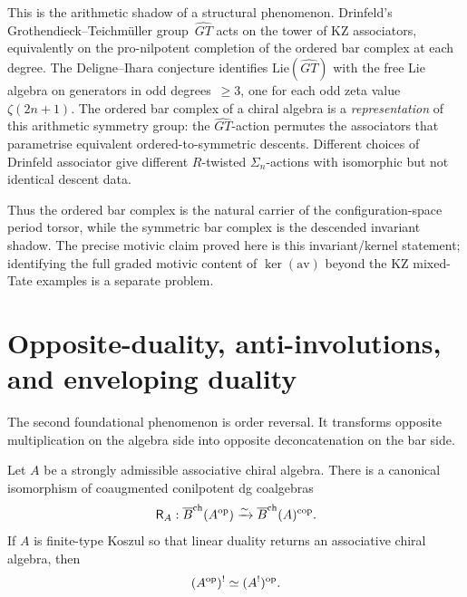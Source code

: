 \begin{remark}
This is the arithmetic shadow of a structural phenomenon.
Drinfeld's Grothendieck--Teichm\"uller group~$\widehat{GT}$
acts on the tower of KZ associators, equivalently on the
pro-nilpotent completion of the ordered bar complex at each
degree. The Deligne--Ihara conjecture identifies
$\mathrm{Lie}(\widehat{GT})$ with the free Lie algebra on
generators in odd degrees~$\geq 3$, one for each odd
zeta value~$\zeta(2n+1)$. The ordered bar complex of a
chiral algebra is a \emph{representation} of this arithmetic
symmetry group: the $\widehat{GT}$-action permutes the
associators that parametrise equivalent ordered-to-symmetric
descents. Different choices of Drinfeld associator give
different $R$-twisted $\Sigma_n$-actions with isomorphic
but not identical descent data.

Thus the ordered bar complex is the natural carrier of the
configuration-space period torsor, while the symmetric bar complex is
the descended invariant shadow. The precise motivic claim proved here
is this invariant/kernel statement; identifying the full graded
motivic content of $\ker(\mathrm{av})$ beyond the KZ mixed-Tate
examples is a separate problem.
\end{remark}

\section{Opposite-duality, anti-involutions, and enveloping duality}
\label{sec:opposite}

The second foundational phenomenon is order reversal. It transforms opposite multiplication on the
algebra side into opposite deconcatenation on the bar side.

\begin{theorem}
\ClaimStatusProvedHere
\label{thm:opposite}
Let $A$ be a strongly admissible associative chiral algebra. There is a canonical isomorphism of
coaugmented conilpotent dg coalgebras
\[
\mathsf{R}_A:\overline{B}^{\mathrm{ch}}(A^{\mathrm{op}})\xrightarrow{\sim}\overline{B}^{\mathrm{ch}}(A)^{\mathrm{cop}}.
\]
If $A$ is finite-type Koszul so that linear duality returns an associative chiral algebra, then
\[
(A^{\mathrm{op}})^!\simeq (A^!)^{\mathrm{op}}.
\]
\end{theorem}

